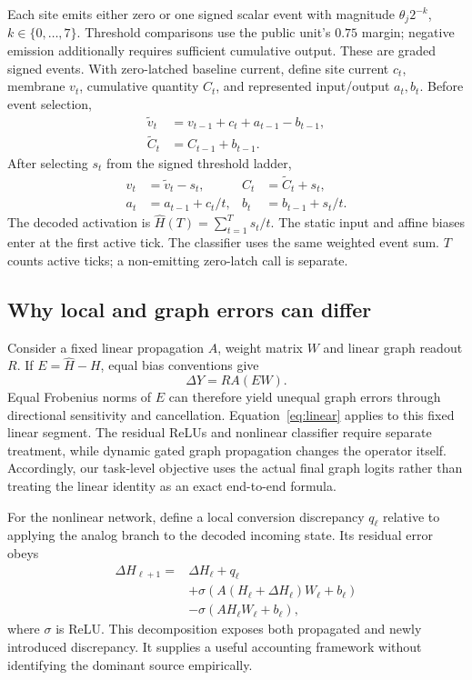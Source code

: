 \documentclass[10pt,twocolumn]{article}
\begin{document}
Each site emits either zero or one signed scalar event with magnitude $\theta_j 2^{-k}$, $k\in\{0,\ldots,7\}$. Threshold comparisons use the public unit's $0.75$ margin; negative emission additionally requires sufficient cumulative output. These are graded signed events. With zero-latched baseline current, define site current $c_t$, membrane $v_t$, cumulative quantity $C_t$, and represented input/output $a_t,b_t$. Before event selection,
\begin{align}
 \widetilde v_t&=v_{t-1}+c_t+a_{t-1}-b_{t-1},\\
 \widetilde C_t&=C_{t-1}+b_{t-1}.
\end{align}
After selecting $s_t$ from the signed threshold ladder,
\begin{align}
 v_t&=\widetilde v_t-s_t,& C_t&=\widetilde C_t+s_t,\\
 a_t&=a_{t-1}+c_t/t,& b_t&=b_{t-1}+s_t/t.
\end{align}
The decoded activation is $\widehat H(T)=\sum_{t=1}^T s_t/t$. The static input and affine biases enter at the first active tick. The classifier uses the same weighted event sum. $T$ counts active ticks; a non-emitting zero-latch call is separate.

\subsection{Why local and graph errors can differ}
Consider a fixed linear propagation $A$, weight matrix $W$ and linear graph readout $R$. If $E=\widehat H-H$, equal bias conventions give
\begin{equation}\label{eq:linear}
 \Delta Y=RA(EW).
\end{equation}
Equal Frobenius norms of $E$ can therefore yield unequal graph errors through directional sensitivity and cancellation. Equation~\eqref{eq:linear} applies to this fixed linear segment. The residual ReLUs and nonlinear classifier require separate treatment, while dynamic gated graph propagation changes the operator itself. Accordingly, our task-level objective uses the actual final graph logits rather than treating the linear identity as an exact end-to-end formula.

For the nonlinear network, define a local conversion discrepancy $q_\ell$ relative to applying the analog branch to the decoded incoming state. Its residual error obeys
\begin{align}
 \Delta H_{\ell+1}={}&\Delta H_\ell+q_\ell\nonumber\\
 &+\sigma(A(H_\ell+\Delta H_\ell)W_\ell+b_\ell)\nonumber\\
 &-\sigma(AH_\ell W_\ell+b_\ell),
\end{align}
where $\sigma$ is ReLU. This decomposition exposes both propagated and newly introduced discrepancy. It supplies a useful accounting framework without identifying the dominant source empirically.
\end{document}
